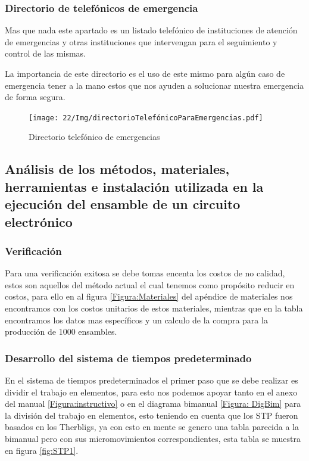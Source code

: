     
    \subsubsection{Directorio de telefónicos de emergencia}
    
    Mas que nada este apartado es un listado telefónico de instituciones de atención de emergencias y otras instituciones que intervengan para el seguimiento y control de las mismas.
    
    La importancia de este directorio es el uso de este mismo para algún caso de emergencia tener a la mano estos  que nos ayuden a solucionar nuestra emergencia de forma segura. 
    
    \begin{figure}[H] 
        \centering
        \texttt{[image: 22/Img/directorioTelefónicoParaEmergencias.pdf]}
        \caption{Directorio telefónico de emergencias}
        \label{fig:Directorio}
    \end{figure}
    
    \subsection{Análisis de los métodos, materiales, herramientas e instalación utilizada en la ejecución del ensamble de un circuito electrónico}
    
    \subsubsection{Verificación}
    
    Para una verificación exitosa se debe tomas encenta los costos de no calidad, estos son aquellos del método actual el cual tenemos como propósito reducir en costos, para ello en al figura \ref{Figura:Materiales} del apéndice de materiales nos encontramos con los costos unitarios de estos materiales, mientras que en la tabla encontramos los datos mas específicos y un calculo de la compra para la producción de 1000 ensambles.
    \subsubsection{Desarrollo del sistema de tiempos predeterminado}
    En el sistema de tiempos predeterminados el primer paso que se debe realizar es dividir el trabajo en elementos, para esto nos podemos apoyar tanto en el anexo del manual \ref{Figura:instructivo} o en el diagrama bimanual \ref{Figura: DigBim} para la división del trabajo en elementos, esto teniendo en cuenta que los STP fueron basados en los Therbligs, ya con esto en mente se genero una tabla parecida a la bimanual pero con sus micromovimientos correspondientes, esta tabla se muestra en figura \ref{fig:STP1}.
    
